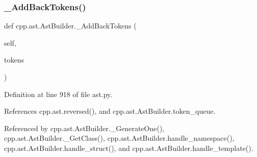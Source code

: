 \subsubsection{\texorpdfstring{\+\_\+\+Add\+Back\+Tokens()}{\_AddBackTokens()}}
{\footnotesize\ttfamily def cpp.\+ast.\+Ast\+Builder.\+\_\+\+Add\+Back\+Tokens (\begin{DoxyParamCaption}\item[{}]{self,  }\item[{}]{tokens }\end{DoxyParamCaption})\hspace{0.3cm}{\ttfamily [private]}}



Definition at line 918 of file ast.\+py.



References cpp.\+ast.\+reversed(), and cpp.\+ast.\+Ast\+Builder.\+token\+\_\+queue.



Referenced by cpp.\+ast.\+Ast\+Builder.\+\_\+\+Generate\+One(), cpp.\+ast.\+Ast\+Builder.\+\_\+\+Get\+Class(), cpp.\+ast.\+Ast\+Builder.\+handle\+\_\+namespace(), cpp.\+ast.\+Ast\+Builder.\+handle\+\_\+struct(), and cpp.\+ast.\+Ast\+Builder.\+handle\+\_\+template().


